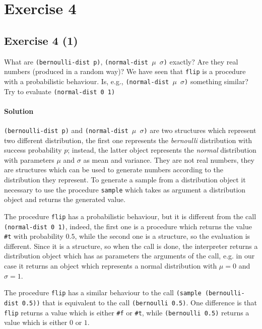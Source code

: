 \section*{Exercise 4}

\subsection*{Exercise 4 (1)}
What are \texttt{(bernoulli-dist p)}, \texttt{(normal-dist $\mu$ $\sigma$)} exactly? Are they real numbers 
(produced in a random way)?
We have seen that \texttt{flip} is a procedure with a probabilistic behaviour. 
Is, e.g., \texttt{(normal-dist $\mu$ $\sigma$)} something similar?
Try to evaluate \texttt{(normal-dist 0 1)}

\paragraph{Solution}
\texttt{(bernoulli-dist p)} and \texttt{(normal-dist $\mu$ $\sigma$)} are two structures which represent 
two different distribution, the first one represents the \textit{bernoulli} distribution with success probability $p$; 
instead, the latter object represents the \textit{normal} distribution with parameters $\mu$ and $\sigma$ as mean and variance.
They are not real numbers, they are structures which can be used to generate numbers according to the distribution they represent.
To generate a sample from a distribution object it necessary to use the procedure \texttt{sample} which takes as argument a 
distribution object and returns the generated value.

The procedure \texttt{flip} has a probabilistic behaviour, but it is different from the call \texttt{(normal-dist 0 1)}, indeed, the 
first one is a procedure which returns the value \texttt{\#t} with probability $0.5$, while the second one is a structure, so the 
evaluation is different. Since it is a structure, so when the call is done, the interpreter returns a distribution object which
has as parameters the arguments of the call, e.g. in our case it returns an object which represents a normal distribution with 
$ \mu = 0 $ and $ \sigma = 1 $.

The procedure \texttt{flip} has a similar behaviour to the call \texttt{(sample (bernoulli-dist 0.5))} that is equivalent to the call
\texttt{(bernoulli 0.5)}. One difference is that \texttt{flip} returns a value which is either \texttt{\#f} or \texttt{\#t}, while 
\texttt{(bernoulli 0.5)} returns a value which is either $0$ or $1$.



